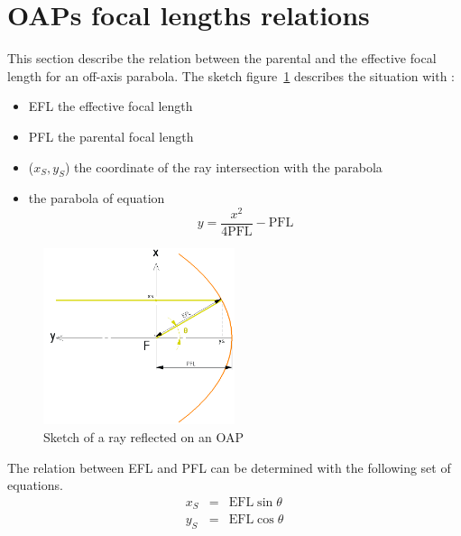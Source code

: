 \appendix
\newpage
\section{OAPs focal lengths relations}\label{sec:EFL2PFL}
This section describe the relation between the parental and the effective focal length for an off-axis parabola. The sketch figure~\ref{fig:EFL2PFL_sketch} describes the situation with :
\begin{itemize}
	\item EFL the effective focal length
	\item PFL the parental focal length
	\item ($x_S, y_S$) the coordinate of the ray intersection with the parabola
	\item the parabola of equation \begin{equation}
	y = \frac{x^2}{4\text{PFL}}-\text{PFL}	\label{eq:parabola_general}
\end{equation}	 
\end{itemize}

\begin{figure}[H]
	\begin{center}
		\includegraphics[width=0.5\textwidth]{images/EFL2PFL_sketch.PNG}
		\caption{Sketch of a ray reflected on an OAP}\label{fig:EFL2PFL_sketch}
	\end{center}
\end{figure}
The relation between EFL and PFL can be determined with the following set of equations.
\begin{eqnarray}
	x_S &= &\text{EFL}\sin\theta \nonumber\\
	y_S &= &\text{EFL}\cos\theta \label{eq:xs_ys}
\end{eqnarray}

